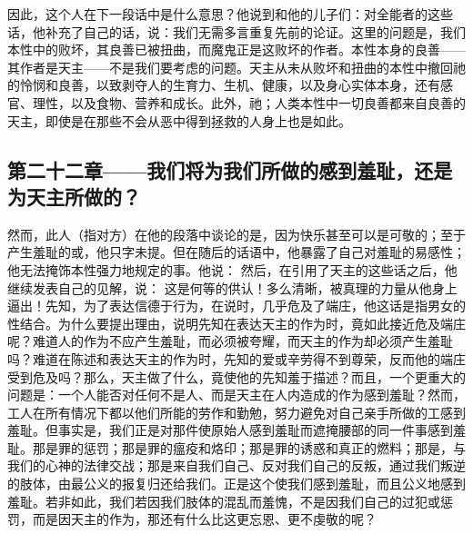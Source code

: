 因此，这个人在下一段话中是什么意思？他说到和他的儿子们：对全能者的这些话，他补充了自己的话，说：我们无需多言重复先前的论证。这里的问题是，我们本性中的败坏，其良善已被扭曲，而魔鬼正是这败坏的作者。本性本身的良善——其作者是天主——不是我们要考虑的问题。天主从未从败坏和扭曲的本性中撤回祂的怜悯和良善，以致剥夺人的生育力、生机、健康，以及身心实体本身，还有感官、理性，以及食物、营养和成长。此外，祂；人类本性中一切良善都来自良善的天主，即使是在那些不会从恶中得到拯救的人身上也是如此。\par


\subsection{第二十二章——我们将为我们所做的感到羞耻，还是为天主所做的？}

然而，此人（指对方）在他的段落中谈论的是，因为快乐甚至可以是可敬的；至于产生羞耻的或，他只字未提。但在随后的话语中，他暴露了自己对羞耻的易感性；他无法掩饰本性强力地规定的事。他说： 然后，在引用了天主的这些话之后，他继续发表自己的见解，说： 这是何等的供认！多么清晰，被真理的力量从他身上逼出！先知，为了表达信德于行为，在说时，几乎危及了端庄，他这话是指男女的性结合。为什么要提出理由，说明先知在表达天主的作为时，竟如此接近危及端庄呢？难道人的作为不应产生羞耻，而必须被夸耀，而天主的作为却必须产生羞耻吗？难道在陈述和表达天主的作为时，先知的爱或辛劳得不到尊荣，反而他的端庄受到危及吗？那么，天主做了什么，竟使他的先知羞于描述？而且，一个更重大的问题是：一个人能否对任何不是人、而是天主在人内造成的作为感到羞耻？然而，工人在所有情况下都以他们所能的劳作和勤勉，努力避免对自己亲手所做的工感到羞耻。但事实是，我们正是对那件使原始人感到羞耻而遮掩腰部的同一件事感到羞耻。那是罪的惩罚；那是罪的瘟疫和烙印；那是罪的诱惑和真正的燃料；那是，与我们的心神的法律交战；那是来自我们自己、反对我们自己的反叛，通过我们叛逆的肢体，由最公义的报复归还给我们。正是这个使我们感到羞耻，而且公义地感到羞耻。若非如此，我们若因我们肢体的混乱而羞愧，不是因我们自己的过犯或惩罚，而是因天主的作为，那还有什么比这更忘恩、更不虔敬的呢？\par


